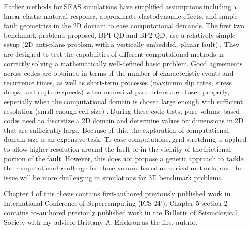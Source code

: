 Earlier methods for SEAS simulations have simplified assumptions including a linear elastic material response, approximate elastodynamic effects, and simple fault geometries in the 2D domain to ease computational demands.
The first two benchmark problems proposed, BP1-QD and BP2-QD, use a relatively simple setup (2D anti-plane problem, with a vertically embedded, planar fault) \citep{10.1785/0220190248}.
They are designed to test the capabilities of different computational methods in correctly solving a mathematically well-defined basic problem.
Good agreements across codes are obtained in terms of the number of characteristic events and recurrence times, as well as short-term processes (maximum slip rates, stress drops, and rupture speeds) when numerical parameters are chosen properly, especially when the computational domain is chosen large enough with sufficient resolution (small enough cell size) \citep{10.1785/0220190248}.
During these code tests, pure volume-based codes need to discretize a 2D domain and determine values for dimensions in 2D that are sufficiently large. Because of this, the exploration of computational domain size is an expensive task.
To ease computations, grid stretching is applied to allow higher resolution around the fault or in the vicinity of the frictional portion of the fault.
However, this does not propose a generic approach to tackle the computational challenge for these volume-based numerical methods, and the issue will be more challenging in simulations for 3D benchmark problems.

Chapter 4 of this thesis contains first-authored previously published work in International Conference of Supercomputing (ICS 24').
Chapter 5 section 2 contains co-authored previouly published work in the Bulletin of Seismological Society with my advisor Brittany A. Erickson as the first author.